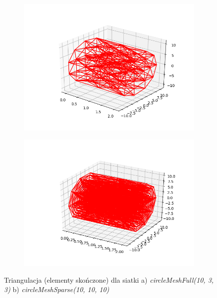 \begin{figure}
\begin{subfigure}{.5\textwidth}
  \centering
  \includegraphics[width=.8\linewidth]{Zdjecia/5/triangulation1}
  \caption{}
  \label{fig:sfig1}
\end{subfigure}%
\begin{subfigure}{.5\textwidth}
  \centering
  \includegraphics[width=.8\linewidth]{Zdjecia/5/triangulation2}
  \caption{}
  \label{fig:sfig2}
\end{subfigure}

\caption{Triangulacja (elementy skończone) dla siatki a) \textit{circleMeshFull(10, 3, 3)} b) \textit{circleMeshSparse(10, 10, 10)}}
\label{fig:triangulation}
\end{figure}


